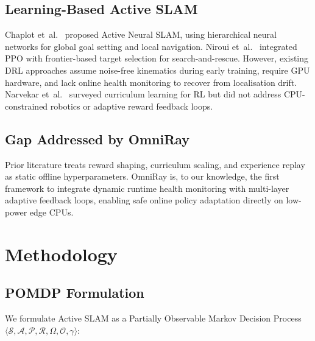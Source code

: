 \documentclass[conference]{IEEEtran}
\begin{document}
\subsection{Learning-Based Active SLAM}
Chaplot et~al.~\cite{chen2020neural} proposed Active Neural SLAM, using hierarchical neural networks for global goal setting and local navigation.
Niroui et~al.~\cite{niroui2019} integrated PPO with frontier-based target selection for search-and-rescue.
However, existing DRL approaches assume noise-free kinematics during early training, require GPU hardware, and lack online health monitoring to recover from localisation drift.
Narvekar et~al.~\cite{narvekar2020} surveyed curriculum learning for RL but did not address CPU-constrained robotics or adaptive reward feedback loops.

\subsection{Gap Addressed by OmniRay}
Prior literature treats reward shaping, curriculum scaling, and experience replay as static offline hyperparameters.
OmniRay is, to our knowledge, the first framework to integrate dynamic runtime health monitoring with multi-layer adaptive feedback loops, enabling safe online policy adaptation directly on low-power edge CPUs.

\section{Methodology}

\subsection{POMDP Formulation}
We formulate Active SLAM as a Partially Observable Markov Decision Process $\langle \mathcal{S}, \mathcal{A}, \mathcal{P}, \mathcal{R}, \Omega, \mathcal{O}, \gamma \rangle$:
\end{document}
